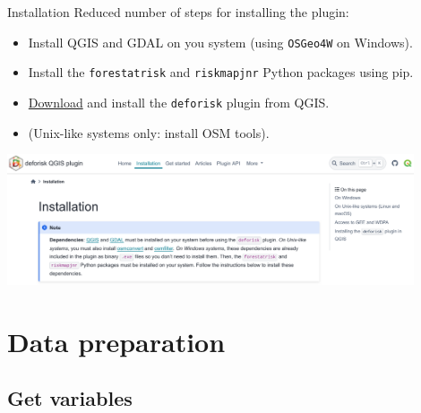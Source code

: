 \documentclass[10pt,table,dvipsnames,compress]{beamer}
\begin{document}
\begin{frame}[label={sec:org7337406},fragile]{Installation}
 Reduced number of steps for installing the plugin:

\begin{itemize}
\item Install QGIS and GDAL on you system (using \texttt{OSGeo4W} on Windows).
\item Install the \texttt{forestatrisk} and \texttt{riskmapjnr} Python packages using pip.
\item \href{https://github.com/ghislainv/deforisk-qgis-plugin/archive/refs/heads/main.zip}{Download} and install the \texttt{deforisk} plugin from QGIS.
\item (Unix-like systems only: install OSM tools).
\end{itemize}

\begin{center}
\includegraphics[width=0.9\textwidth]{figs/installation.png}
\end{center}
\end{frame}

\section{Data preparation}
\label{sec:org075a2c7}

\subsection{Get variables}
\label{sec:org9703005}
\end{document}
